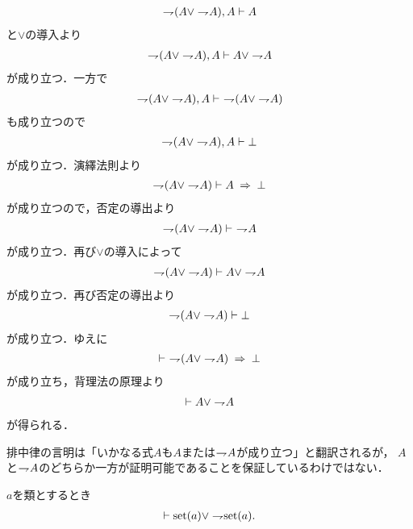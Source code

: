 	\begin{prf}
		\begin{align}
			\negation (A \vee \negation A), A \vdash A
		\end{align}
		と$\vee$の導入より
		\begin{align}
			\negation (A \vee \negation A), A \vdash A \vee \negation A
		\end{align}
		が成り立つ．一方で
		\begin{align}
			\negation (A \vee \negation A), A \vdash\ \negation (A \vee \negation A)
		\end{align}
		も成り立つので
		\begin{align}
			\negation (A \vee \negation A), A \vdash \bot
		\end{align}
		が成り立つ．演繹法則より
		\begin{align}
			\negation (A \vee \negation A) \vdash A \rarrow \bot
		\end{align}
		が成り立つので，否定の導出より
		\begin{align}
			\negation (A \vee \negation A) \vdash\ \negation A
		\end{align}
		が成り立つ．再び$\vee$の導入によって
		\begin{align}
			\negation (A \vee \negation A) \vdash A \vee \negation A
		\end{align}
		が成り立つ．再び否定の導出より
		\begin{align}
			\negation (A \vee \negation A) \vdash \bot
		\end{align}
		が成り立つ．ゆえに
		\begin{align}
			\vdash\ \negation (A \vee \negation A) \rarrow \bot
		\end{align}
		が成り立ち，背理法の原理より
		\begin{align}
			\vdash A \vee \negation A
		\end{align}
		が得られる．
		\QED
	\end{prf}
	
	排中律の言明は「いかなる式$A$も$A$または$\negation A$が成り立つ」と翻訳されるが，
	$A$と$\negation A$のどちらか一方が証明可能であることを保証しているわけではない．
	
	\begin{screen}
		\begin{thm}[類は集合であるか真類であるかのいずれかに定まる]
			$a$を類とするとき
			\begin{align}
				\vdash \set{a} \vee \negation \set{a}.
			\end{align}
		\end{thm}
	\end{screen}
	
